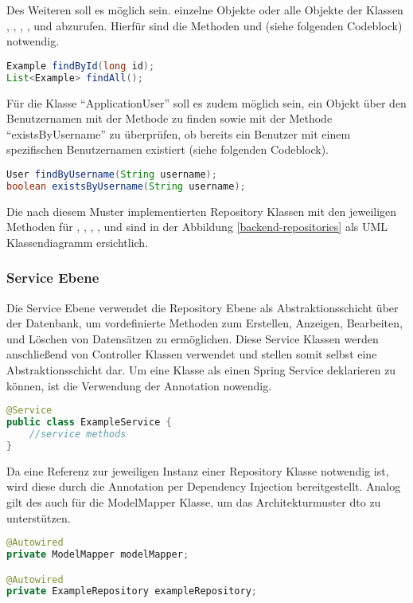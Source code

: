 Des Weiteren soll es möglich sein. einzelne Objekte oder alle Objekte der Klassen , , , ,  und  abzurufen.
Hierfür sind die Methoden  und  (siehe folgenden Codeblock) notwendig.
\begin{lstlisting}[language=Java]
Example findById(long id);
List<Example> findAll();
\end{lstlisting}

Für die Klasse \enquote{ApplicationUser} soll es zudem möglich sein, ein Objekt über den Benutzernamen mit der Methode  zu finden sowie mit der Methode \enquote{existsByUsername} zu überprüfen, ob bereits ein Benutzer mit einem spezifischen Benutzernamen existiert (siehe folgenden Codeblock).
\begin{lstlisting}[language=Java]
User findByUsername(String username);
boolean existsByUsername(String username);
\end{lstlisting}
Die nach diesem Muster implementierten Repository Klassen mit den jeweiligen Methoden für , , , ,  und  sind in der Abbildung \ref{backend-repositories} als UML Klassendiagramm ersichtlich.


\clearpage

\subsubsection{Service Ebene}
Die Service Ebene verwendet die Repository Ebene als Abstraktionsschicht über der Datenbank, um vordefinierte Methoden zum Erstellen, Anzeigen, Bearbeiten, und Löschen von Datensätzen zu ermöglichen. Diese Service Klassen werden anschließend von Controller Klassen verwendet und stellen somit selbst eine Abstraktionsschicht dar.
Um eine Klasse als einen Spring Service deklarieren zu können, ist die Verwendung der Annotation  nowendig.
\begin{lstlisting}[language=Java]
@Service
public class ExampleService {
	//service methods
}
\end{lstlisting}

Da eine Referenz zur jeweiligen Instanz einer Repository Klasse notwendig ist, wird diese durch die Annotation  per Dependency Injection bereitgestellt. Analog gilt des auch für die ModelMapper Klasse, um das Architekturmuster \gls{dto} zu unterstützen.
\begin{lstlisting}[language=Java]
@Autowired
private ModelMapper modelMapper;

@Autowired
private ExampleRepository exampleRepository;
\end{lstlisting}

